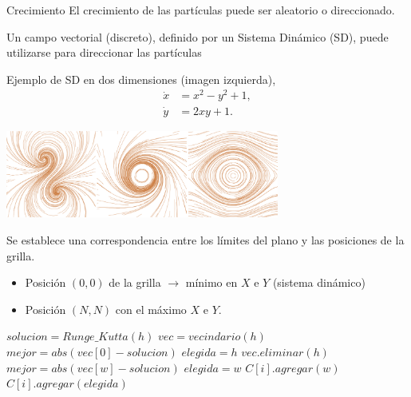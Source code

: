 \documentclass[spanish,unknownkeysallowed]{beamer}
\begin{document}
\begin{frame}{Crecimiento}
El crecimiento de las partículas puede ser aleatorio o direccionado.

Un campo vectorial (discreto), definido por un Sistema Dinámico (SD), puede utilizarse para direccionar las partículas 

Ejemplo de SD en dos dimensiones (imagen izquierda),
\begin{equation*} \label{eq:simple}  
  \begin{aligned}
    \dot{x} &= x^{2}-y^{2}+1,\\
    \dot{y} &= 2xy+1.
  \end{aligned}
\end{equation*}
  \centerline{\includegraphics[width=9cm]{../figures/Fig2}}
\end{frame}

\begin{frame}
Se establece una correspondencia entre los límites del plano y las posiciones de la grilla.

\begin{itemize}
\item Posición $(0,0)$ de la grilla $\rightarrow$ mínimo en $X$ e $Y$ (sistema dinámico)
\item Posición $(N,N)$ con el máximo $X$ e $Y$.
\end{itemize}

\end{frame}

\begin{frame}
\begin{algorithm}[H]
\begin{algorithmic}[1]
\STATE $solucion = Runge\_Kutta(h)$
\STATE $vec = vecindario(h)$
\STATE $mejor = abs(vec[0] - solucion)$
\STATE $elegida = h$
\STATE $vec.eliminar(h)$
        \STATE $mejor = abs(vec[w]-solucion)$
        \STATE $elegida = w$
    \ENDIF
        \STATE $C[i].agregar(w)$
    \ENDIF
\ENDFOR
\STATE $C[i].agregar(elegida)$
\end{algorithmic}
\end{algorithm}
\end{frame}
\end{document}
